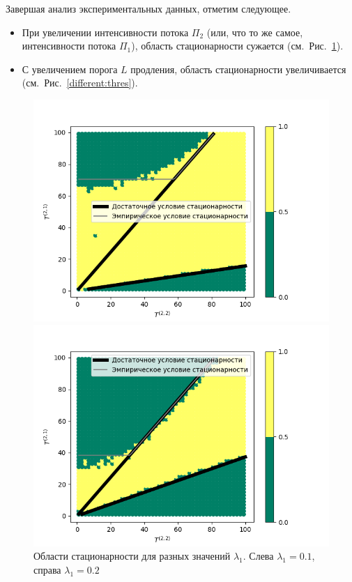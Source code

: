 \documentclass{report}
\begin{document}
Завершая анализ экспериментальных данных, отметим следующее.
\begin{itemize}
    \item При увеличении интенсивности потока $\Pi_2$ (или, что то же самое, интенсивности потока $\Pi_1$), область стационарности сужается (см.~Рис.~\ref{Experiment:intensities}).
    \item С увеличением порога $L$ продления, область стационарности увеличивается (см.~Рис.~\ref{different:thres}). 
\end{itemize}
\begin{figure}
\begin{multicols}{2}
    \includegraphics[width=1.2\linewidth]{0_1_thres_10_fact.png}\par 
    \includegraphics[width=1.2\linewidth]{0_2_thres_10_fact.png}\par 
    \end{multicols}
\caption{Области стационарности для разных значений $\lambda_1$. Слева $\lambda_1=0.1$, справа $\lambda_1=0.2$}
\label{Experiment:intensities}
\end{figure}
\end{document}
